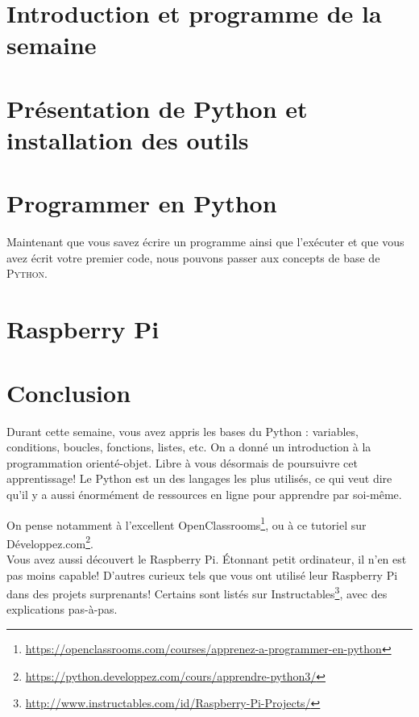\documentclass[12pt,a4paper,oneside]{report}
\begin{document}


\tableofcontents

\chapter{Introduction et programme de la semaine}



\chapter{Présentation de Python et installation des outils}



\chapter{Programmer en Python}
Maintenant que vous savez écrire un programme ainsi que l'exécuter et que vous avez écrit votre premier code, nous pouvons passer aux concepts de base de \textsc{Python}.




\chapter{Raspberry Pi}





\chapter{Conclusion}

Durant cette semaine, vous avez appris les bases du Python : variables, conditions, boucles, fonctions, listes, etc. On a donné un introduction à la programmation orienté-objet. Libre à vous désormais de poursuivre cet apprentissage! Le Python est un des langages les plus utilisés, ce qui veut dire qu'il y a aussi énormément de ressources en ligne pour apprendre par soi-même.

On pense notamment à l'excellent OpenClassrooms\footnote{\url{https://openclassrooms.com/courses/apprenez-a-programmer-en-python}}, ou à ce tutoriel sur Développez.com\footnote{\url{https://python.developpez.com/cours/apprendre-python3/}}.\\

Vous avez aussi découvert le Raspberry Pi. Étonnant petit ordinateur, il n'en est pas moins capable! D'autres curieux tels que vous ont utilisé leur Raspberry Pi dans des projets surprenants! Certains sont listés sur Instructables\footnote{\url{http://www.instructables.com/id/Raspberry-Pi-Projects/}}, avec des explications pas-à-pas.\\
\end{document}
